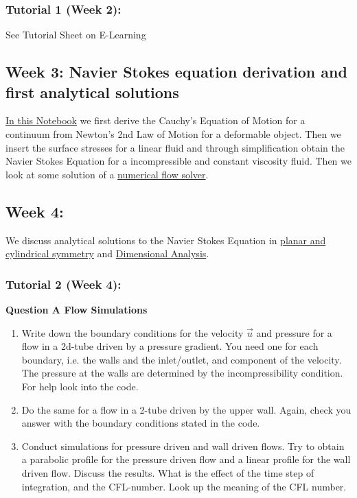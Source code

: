 \documentclass[11pt]{article}
\providecommand{\tightlist}{%
      \setlength{\itemsep}{0pt}\setlength{\parskip}{0pt}}
\begin{document}
\subsubsection{Tutorial 1 (Week 2):}\label{tutorial-1-week-2-1}

See Tutorial Sheet on E-Learning

\subsection{Week 3: Navier Stokes equation derivation and first
analytical
solutions}\label{week-3-navier-stokes-equation-derivation-and-first-analytical-solutions-1}

\href{Cauchy's\%20Equation\%20of\%20Motion\%20\&\%20Navier\%20Stokes\%20Equation.ipynb}{In
this Notebook} we first derive the Cauchy's Equation of Motion for a
continuum from Newton's 2nd Law of Motion for a deformable object. Then
we insert the surface stresses for a linear fluid and through
simplification obtain the Navier Stokes Equation for a incompressible
and constant viscosity fluid. Then we look at some solution of a
\href{13a_Navier\%20Stokes\%20example.ipynb}{numerical flow solver}.

\subsection{Week 4:}\label{week-4-1}

We discuss analytical solutions to the Navier Stokes Equation in
\href{Analytical\%20solutions\%20to\%20steady\%20and\%20laminar\%20flows.ipynb}{planar
and cylindrical symmetry} and
\href{Dimensional\%20Analysis\%20of\%20the\%20Navier\%20Stokes\%20Equation.ipynb}{Dimensional
Analysis}.

\subsubsection{Tutorial 2 (Week 4):}\label{tutorial-2-week-4-1}

\textbf{Question A Flow Simulations}

\begin{enumerate}
\def\labelenumi{\arabic{enumi}.}
\tightlist
\item
  Write down the boundary conditions for the velocity \(\vec{u}\) and
  pressure for a flow in a 2d-tube driven by a pressure gradient. You
  need one for each boundary, i.e. the walls and the inlet/outlet, and
  component of the velocity. The pressure at the walls are determined by
  the incompressibility condition. For help look into the code.
\item
  Do the same for a flow in a 2-tube driven by the upper wall. Again,
  check you answer with the boundary conditions stated in the code.
\item
  Conduct simulations for pressure driven and wall driven flows. Try to
  obtain a parabolic profile for the pressure driven flow and a linear
  profile for the wall driven flow. Discuss the results. What is the
  effect of the time step of integration, and the CFL-number. Look up
  the meaning of the CFL number.
\end{enumerate}
\end{document}
